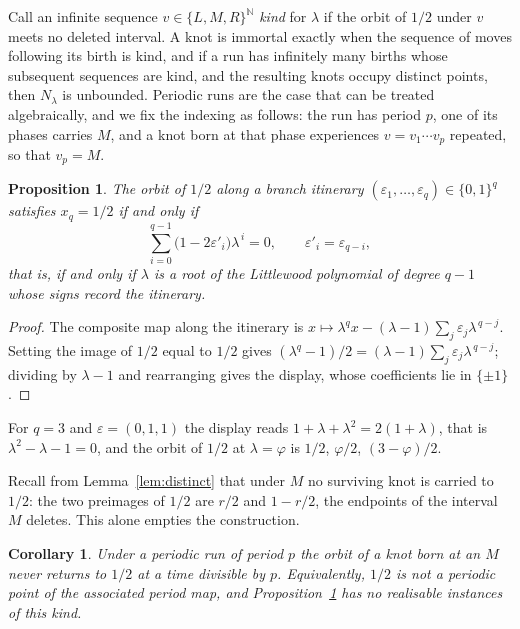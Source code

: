 \documentclass[11pt,reqno]{amsart}
\theoremstyle{plain}
\newtheorem{proposition}[theorem]{Proposition}
\newtheorem{corollary}[theorem]{Corollary}
\theoremstyle{definition}
\theoremstyle{remark}
\begin{document}
Call an infinite sequence $v\in\{L,M,R\}^{\mathbb N}$ \emph{kind} for $\lambda$
if the orbit of $1/2$ under $v$ meets no deleted interval. A knot is immortal
exactly when the sequence of moves following its birth is kind, and if a run has
infinitely many births whose subsequent sequences are kind, and the resulting
knots occupy distinct points, then $N_\lambda$ is unbounded. Periodic runs are
the case that can be treated algebraically, and we fix the indexing as follows:
the run has period $p$, one of its phases carries $M$, and a knot born at that
phase experiences $v=v_1\cdots v_p$ repeated, so that $v_p=M$.

\begin{proposition}\label{prop:littlewood}
The orbit of $1/2$ along a branch itinerary $(\varepsilon_1,\dots,\varepsilon_q)
\in\{0,1\}^q$ satisfies $x_q=1/2$ if and only if
\[
  \sum_{i=0}^{q-1}\bigl(1-2\varepsilon'_i\bigr)\lambda^{\,i}=0,
  \qquad \varepsilon'_i=\varepsilon_{q-i},
\]
that is, if and only if $\lambda$ is a root of the Littlewood polynomial of
degree $q-1$ whose signs record the itinerary.
\end{proposition}

\begin{proof}
The composite map along the itinerary is $x\mapsto\lambda^q
x-(\lambda-1)\sum_{j}\varepsilon_j\lambda^{\,q-j}$. Setting the image of $1/2$
equal to $1/2$ gives $(\lambda^q-1)/2=(\lambda-1)\sum_j\varepsilon_j
\lambda^{\,q-j}$; dividing by $\lambda-1$ and rearranging gives the display,
whose coefficients lie in $\{\pm1\}$.
\end{proof}

For $q=3$ and $\varepsilon=(0,1,1)$ the display reads $1+\lambda+\lambda^2=
2(1+\lambda)$, that is $\lambda^2-\lambda-1=0$, and the orbit of $1/2$ at
$\lambda=\varphi$ is $1/2$, $\varphi/2$, $(3-\varphi)/2$.

Recall from Lemma~\ref{lem:distinct} that under $M$ no surviving knot is carried
to $1/2$: the two preimages of $1/2$ are $r/2$ and $1-r/2$, the endpoints of the
interval $M$ deletes. This alone empties the construction.

\begin{corollary}\label{cor:noperiodic}
Under a periodic run of period $p$ the orbit of a knot born at an $M$ never
returns to $1/2$ at a time divisible by $p$. Equivalently, $1/2$ is not a
periodic point of the associated period map, and
Proposition~\ref{prop:littlewood} has no realisable instances of this kind.
\end{corollary}
\end{document}
